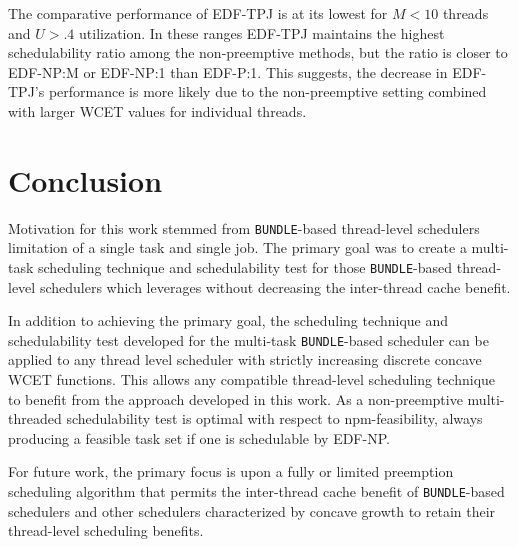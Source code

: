 \documentclass[a4paper,UKenglish,cleveref,autoref,english]{lipics-v2019}
\begin{document}
The comparative performance of EDF-TPJ is at its lowest
for ${M < 10}$ threads and ${U > .4}$ utilization. In these ranges
EDF-TPJ maintains the highest schedulability ratio among the
non-preemptive methods, but the ratio is closer to EDF-NP:M or
EDF-NP:1 than EDF-P:1. This suggests, the decrease in EDF-TPJ's
performance is more likely due to the non-preemptive setting combined
with larger WCET values for individual threads.

\section{Conclusion}\label{sec:conclusion}

Motivation for this work stemmed from \texttt{BUNDLE}-based
thread-level schedulers limitation of a single task and single
job. The primary goal was to create a multi-task scheduling technique
and schedulability test for those \texttt{BUNDLE}-based thread-level
schedulers which leverages without decreasing the inter-thread cache
benefit.

In addition to achieving the primary goal, the scheduling technique
and schedulability test developed for the multi-task
\texttt{BUNDLE}-based scheduler can be applied to any thread level
scheduler with strictly increasing discrete concave WCET
functions. This allows any compatible thread-level scheduling
technique to benefit from the \tpj{} approach developed in this
work. As a non-preemptive multi-threaded schedulability test \tpj{} is
optimal with respect to npm-feasibility, always producing a feasible
task set if one is schedulable by EDF-NP.

For future work, the primary focus is upon a fully or limited preemption
scheduling algorithm that permits the inter-thread cache benefit of
\texttt{BUNDLE}-based schedulers and other schedulers
characterized by concave growth to retain their thread-level
scheduling benefits.


\end{document}
